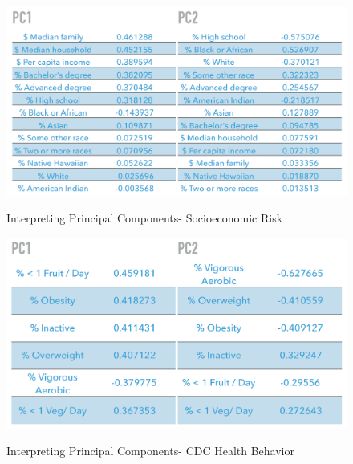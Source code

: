 \documentclass{article}
\begin{document}
\begin{figure}[h]
	\centering
	\caption{Interpreting Principal Components- Socioeconomic Risk}
	\includegraphics[width=\linewidth]{images/interpreting_pca_socioeconomic.png}
	\label{fig:pcaInterpretSocio}
\end{figure}

\begin{figure}[h]
	\centering
	\caption{Interpreting Principal Components- CDC Health Behavior}
	\includegraphics[width=\linewidth]{images/interpreting_pca_cdc.png}
	\label{fig:pcaInterpretCDC}
\end{figure}



\end{document}
